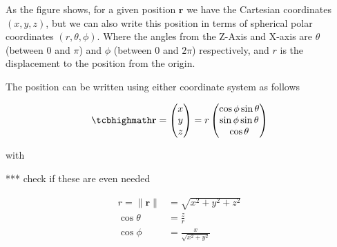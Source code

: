 As the figure shows, for a given position $\mathbf{r}$ we have the Cartesian coordinates $({x},{y},{z})$, but we can also write this position in terms of spherical polar coordinates $(r,\theta,\phi)$.
Where the angles from the Z-Axis and X-axis are $\theta$ (between 0 and $\pi$) and $\phi$ (between 0 and $2\pi$) respectively, and ${r}$ is the displacement to the position from the origin.

The position can be written using either coordinate system as follows

\begin{equation}
	\mhl{
		\mathbf{r} =
		\begin{pmatrix}
			x \\
			y \\
			z \\
		\end{pmatrix}
		= r
		\begin{pmatrix}
			\cos{\phi}\sin{\theta} \\
			\sin{\phi}\sin{\theta} \\
			\cos{\theta}           \\
		\end{pmatrix}
	}
\end{equation}

with

*** check if these are even needed

\begin{equation}
	\begin{aligned}
		r = \|\mathbf{r}\| & =\sqrt{x^2 + y^2 + z^2}      \\
		\cos\theta         & = \frac{z}{r}                \\
		\cos\phi           & = \frac{x}{\sqrt{x^2 + y^2}}
	\end{aligned}
\end{equation}




